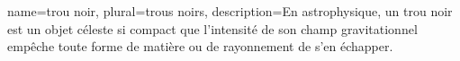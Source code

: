 {
	name={trou noir},
	plural={trous noirs},
	description={En astrophysique, un trou noir est un objet céleste si compact que l'intensité de son champ gravitationnel empêche toute forme de matière ou de rayonnement de s'en échapper.}
}


